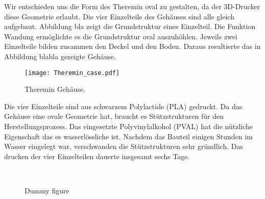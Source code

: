 Wir entschieden uns die Form des Theremin oval zu gestalten, da der 3D-Drucker diese Geometrie erlaubt. Die vier Einzelteile des Gehäuses sind alle gleich aufgebaut. Abbildung bla zeigt die Grundstruktur eines Einzelteil. Die Funktion Wandung ermöglichte es die Grundstruktur oval auszuhöhlen. Jeweils zwei Einzelteile bilden zusammen den Deckel und den Boden. Daraus resultierte das in Abbildung blabla gezeigte Gehäuse. 
\begin{figure}[h]
	\centering
	\texttt{[image: Theremin\_case.pdf]}
	\caption{Theremin Gehäuse.}
	\label{img:bitmap}
\end{figure}
Die vier Einzelteile sind aus schwarzem Polylactide (PLA)  gedruckt. Da das Gehäuse eine ovale Geometrie hat, braucht es Stützstrukturen für den Herstellungsprozess. Das eingesetzte Polyvinylalkohol (PVAL) hat die nützliche Eigenschaft das es  wasserlössliche ist. Nachdem das Bauteil einigen Stunden im Wasser eingelegt war, verschwanden die Stützstrukturen sehr gründlich. 
Das drucken der vier Einzelteilen dauerte insgesamt sechs Tage.
\begin{figure}[!ht]
	\hfill
	\hfill
	\\
	\hfill
	\hfill
	\caption{Dummy figure}
	\label{fig:dummy}
\end{figure}    



